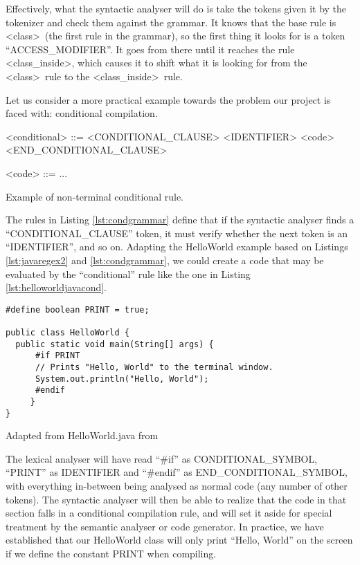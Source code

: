Effectively, what the syntactic analyser will do is take the tokens given it by the tokenizer and check them against the \gls{grammar}. It knows that the base rule is \textless class\textgreater \ (the first rule in the grammar), so the first thing it looks for is a token ``ACCESS_MODIFIER''. It goes from there until it reaches the rule \textless class_inside\textgreater , which causes it to shift what it is looking for from the \textless class\textgreater \ rule to the \textless class_inside\textgreater \ rule.

Let us consider a more practical example towards the problem our project is faced with: conditional compilation.

\begin{listing}
\begin{grammar}
<conditional> ::= <CONDITIONAL_CLAUSE> <IDENTIFIER> <code> <END_CONDITIONAL_CLAUSE>

<code> ::= ...
\end{grammar}
\caption{Example of non-terminal conditional rule.} \label{lst:condgrammar}
\end{listing}

The rules in Listing \ref{lst:condgrammar} define that if the syntactic analyser finds a ``CONDITIONAL_CLAUSE'' token, it must verify whether the next token is an ``IDENTIFIER'', and so on. Adapting the HelloWorld example based on Listings \ref{lst:javaregex2} and \ref{lst:condgrammar}, we could create a code that may be evaluated by the ``conditional'' rule like the one in Listing \ref{lst:helloworldjavacond}.

\begin{listing}
\begin{verbatim}
#define boolean PRINT = true;

public class HelloWorld {
  public static void main(String[] args) {
      #if PRINT
      // Prints "Hello, World" to the terminal window.
      System.out.println("Hello, World");
      #endif
     }
}
\end{verbatim}
\caption{Adapted from HelloWorld.java from \cite{SEDGEWICK:2011}} \label{lst:helloworldjavacond}
\end{listing}

The lexical analyser will have read ``\#if'' as CONDITIONAL_SYMBOL, ``PRINT'' as IDENTIFIER and ``\#endif'' as END_CONDITIONAL_SYMBOL, with everything in-between being analysed as normal code (any number of other tokens). The syntactic analyser will then be able to realize that the code in that section falls in a conditional compilation rule, and will set it aside for special treatment by the semantic analyser or code generator. In practice, we have established that our HelloWorld class will only print ``Hello, World'' on the screen if we define the constant PRINT when compiling.

